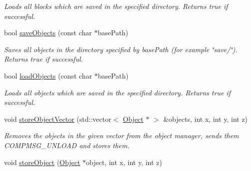 \begin{DoxyCompactItemize}
\begin{DoxyCompactList}\small\item\em \-Loads all blocks which are saved in the specified directory. \-Returns true if successful. \end{DoxyCompactList}\item 
\hypertarget{classGameDataStorage_a12450b53159a6fc02a2c70a7b96f4215}{
bool \hyperlink{classGameDataStorage_a12450b53159a6fc02a2c70a7b96f4215}{save\-Objects} (const char $\ast$base\-Path)}
\label{dc/d0b/classGameDataStorage_a12450b53159a6fc02a2c70a7b96f4215}

\begin{DoxyCompactList}\small\item\em \-Saves all objects in the directory specified by base\-Path (for example \char`\"{}save/\char`\"{}). \-Returns true if successful. \end{DoxyCompactList}\item 
\hypertarget{classGameDataStorage_a71dd23875efc0fb6d1783031f29e967e}{
bool \hyperlink{classGameDataStorage_a71dd23875efc0fb6d1783031f29e967e}{load\-Objects} (const char $\ast$base\-Path)}
\label{dc/d0b/classGameDataStorage_a71dd23875efc0fb6d1783031f29e967e}

\begin{DoxyCompactList}\small\item\em \-Loads all objects which are saved in the specified directory. \-Returns true if successful. \end{DoxyCompactList}\item 
\hypertarget{classGameDataStorage_a6073f973df1af79c2680008f15a4e028}{
void \hyperlink{classGameDataStorage_a6073f973df1af79c2680008f15a4e028}{store\-Object\-Vector} (std\-::vector$<$ \hyperlink{classObject}{\-Object} $\ast$ $>$ \&objects, int x, int y, int z)}
\label{dc/d0b/classGameDataStorage_a6073f973df1af79c2680008f15a4e028}

\begin{DoxyCompactList}\small\item\em \-Removes the objects in the given vector from the object manager, sends them \-C\-O\-M\-P\-M\-S\-G\-\_\-\-U\-N\-L\-O\-A\-D and stores them. \end{DoxyCompactList}\item 
\hypertarget{classGameDataStorage_ace21670cd13870dff67fbad801ec3b76}{
void \hyperlink{classGameDataStorage_ace21670cd13870dff67fbad801ec3b76}{store\-Object} (\hyperlink{classObject}{\-Object} $\ast$object, int x, int y, int z)}
\label{dc/d0b/classGameDataStorage_ace21670cd13870dff67fbad801ec3b76}


\end{DoxyCompactItemize}

